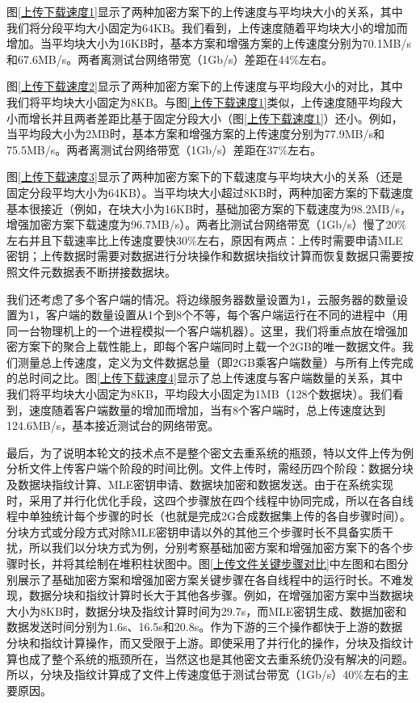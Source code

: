 \documentclass[promaster]{thesis-uestc}
\begin{document}
图\ref{上传下载速度1}显示了两种加密方案下的上传速度与平均块大小的关系，其中我们将分段平均大小固定为64KB。我们看到，上传速度随着平均块大小的增加而增加。当平均块大小为16KB时，基本方案和增强方案的上传速度分别为70.1MB/s和67.6MB/s。两者离测试台网络带宽（1Gb/s）差距在44\%左右。

图\ref{上传下载速度2}显示了两种加密方案下的上传速度与平均段大小的对比，其中我们将平均块大小固定为8KB。与图\ref{上传下载速度1}类似，上传速度随平均段大小而增长并且两者差距比基于固定分段大小（图\ref{上传下载速度1}）还小。例如，当平均段大小为2MB时，基本方案和增强方案的上传速度分别为77.9MB/s和75.5MB/s。两者离测试台网络带宽（1Gb/s）差距在37\%左右。

图\ref{上传下载速度3}显示了两种加密方案下的下载速度与平均块大小的关系（还是固定分段平均大小为64KB）。当平均块大小超过8KB时，两种加密方案的下载速度基本很接近（例如，在块大小为16KB时，基础加密方案的下载速度为98.2MB/s，增强加密方案下载速度为96.7MB/s）。两者比测试台网络带宽（1Gb/s）慢了20\%左右并且下载速率比上传速度要快30\%左右，原因有两点：上传时需要申请MLE密钥；上传数据时需要对数据进行分块操作和数据块指纹计算而恢复数据只需要按照文件元数据表不断拼接数据块。

我们还考虑了多个客户端的情况。将边缘服务器数量设置为1，云服务器的数量设置为1，客户端的数量设置从1个到8个不等，每个客户端运行在不同的进程中（用同一台物理机上的一个进程模拟一个客户端机器）。这里，我们将重点放在增强加密方案下的聚合上载性能上，即每个客户端同时上载一个2GB的唯一数据文件。我们测量总上传速度，定义为文件数据总量（即2GB乘客户端数量）与所有上传完成的总时间之比。图\ref{上传下载速度4}显示了总上传速度与客户端数量的关系，其中我们将平均块大小固定为8KB，平均段大小固定为1MB（128个数据块）。我们看到，速度随着客户端数量的增加而增加，当有8个客户端时，总上传速度达到124.6MB/s，基本接近测试台的网络带宽。

最后，为了说明本轮文的技术点不是整个密文去重系统的瓶颈，特以文件上传为例分析文件上传客户端个阶段的时间比例。文件上传时，需经历四个阶段：数据分块及数据块指纹计算、MLE密钥申请、数据块加密和数据发送。由于在系统实现时，采用了并行化优化手段，这四个步骤放在四个线程中协同完成，所以在各自线程中单独统计每个步骤的时长（也就是完成2G合成数据集上传的各自步骤时间）。分块方式或分段方式对除MLE密钥申请以外的其他三个步骤时长不具备实质干扰，所以我们以分块方式为例，分别考察基础加密方案和增强加密方案下的各个步骤时长，并将其绘制在堆积柱状图中。图\ref{上传文件关键步骤对比}中左图和右图分别展示了基础加密方案和增强加密方案关键步骤在各自线程中的运行时长。不难发现，数据分块和指纹计算时长大于其他各步骤。例如，在增强加密方案中当数据块大小为8KB时，数据分块及指纹计算时间为29.7s，而MLE密钥生成、数据加密和数据发送时间分别为1.6s、16.5s和20.8s。作为下游的三个操作都快于上游的数据分块和指纹计算操作，而又受限于上游。即使采用了并行化的操作，分块及指纹计算也成了整个系统的瓶颈所在，当然这也是其他密文去重系统仍没有解决的问题。所以，分块及指纹计算成了文件上传速度低于测试台带宽（1Gb/s）40\%左右的主要原因。
\end{document}
